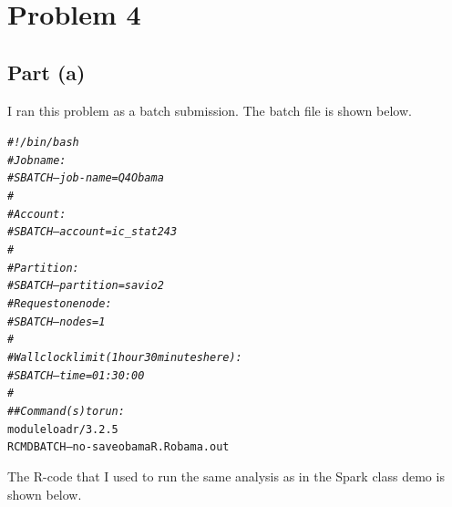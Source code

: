 \documentclass{article}\usepackage[]{graphicx}\usepackage[]{color}
\makeatletter
\newcommand{\hlcom}[1]{\textcolor[rgb]{0.678,0.584,0.686}{\textit{#1}}}%
\newenvironment{kframe}{%
 \def\at@end@of@kframe{}%
 \ifinner\ifhmode%
  \def\at@end@of@kframe{\end{minipage}}%
  \begin{minipage}{\columnwidth}%
 \fi\fi%
 \def\FrameCommand##1{\hskip\@totalleftmargin \hskip-\fboxsep
 \colorbox{shadecolor}{##1}\hskip-\fboxsep
     \hskip-\linewidth \hskip-\@totalleftmargin \hskip\columnwidth}%
 \MakeFramed {\advance\hsize-\width
   \@totalleftmargin\z@ \linewidth\hsize
   \@setminipage}}%
 {\par\unskip\endMakeFramed%
 \at@end@of@kframe}
\newenvironment{knitrout}{}{} %
\makeatother
\begin{document}
\section{Problem 4}
\subsection{Part (a)}
I ran this problem as a batch submission.  The batch file is shown below.
\begin{knitrout}
\color{fgcolor}\begin{kframe}
\begin{alltt}
\hlcom{#!/bin/bash}
\hlcom{# Job name:}
\hlcom{#SBATCH --job-name=Q4Obama}
\hlcom{#}
\hlcom{# Account:}
\hlcom{#SBATCH --account=ic_stat243}
\hlcom{#}
\hlcom{# Partition:}
\hlcom{#SBATCH --partition=savio2}
\hlcom{# Request one node:}
\hlcom{#SBATCH--nodes=1}
\hlcom{#}
\hlcom{# Wall clock limit (1 hour 30 minutes here):}
\hlcom{#SBATCH --time=01:30:00}
\hlcom{#}
\hlcom{## Command(s) to run:}
module load r/3.2.5
R CMD BATCH --no-save obamaR.R obama.out
\end{alltt}
\end{kframe}
\end{knitrout}
The R-code that I used to run the same analysis as in the Spark class demo is shown below.
\end{document}
